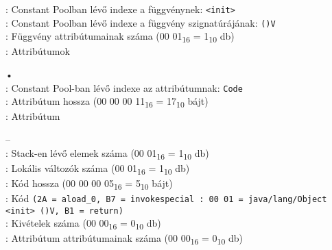 \begin{compactitem}
\begin{compactitem}
    : Constant Poolban lévő indexe a függvénynek: \lstinline{<init>} \\
    : Constant Poolban lévő indexe a függvény szignatúrájának: \lstinline{()V} \\
    : Függvény attribútumainak száma (00 01\textsubscript{16} = 1\textsubscript{10} db) \\
    : Attribútumok
    \begin{compactitem}
        \setlength\itemsep{-5px}
        \item[•]    \\
        : Constant Pool-ban lévő indexe az attribútumnak: \lstinline{Code} \\
        : Attribútum hossza (00 00 00 11\textsubscript{16} = 17\textsubscript{10} bájt) \\
        : Attribútum
            \begin{compactitem}
            \setlength\itemsep{0px}
                \item[–]       \\
                : Stack-en lévő elemek száma (00 01\textsubscript{16} = 1\textsubscript{10} db) \\
                : Lokális változók száma (00 01\textsubscript{16} = 1\textsubscript{10} db) \\
                : Kód hossza (00 00 00 05\textsubscript{16} = 5\textsubscript{10} bájt) \\
                : Kód \lstinline{(2A = aload_0, B7 = invokespecial : 00 01 = java/lang/Object <init> ()V, B1 = return)}  \\
                : Kivételek száma (00 00\textsubscript{16} = 0\textsubscript{10} db) \\
                : Attribútum attribútumainak száma (00 00\textsubscript{16} = 0\textsubscript{10} db)
        \end{compactitem}

\end{compactitem}
\end{compactitem}
\end{compactitem}
